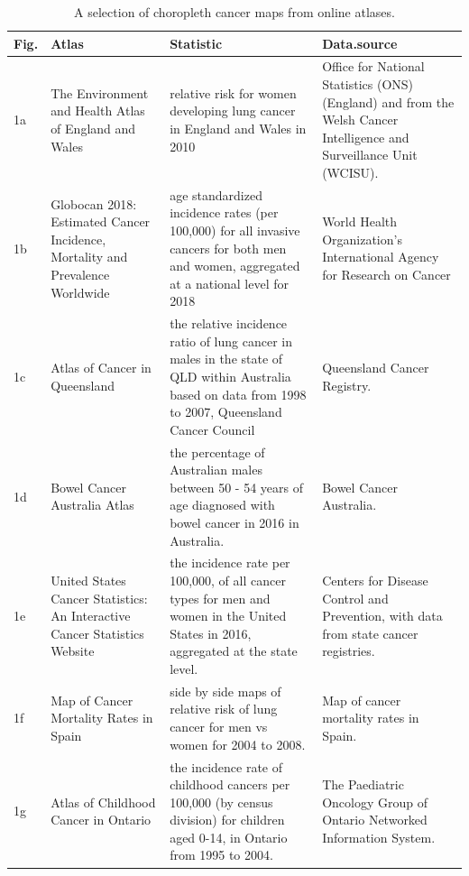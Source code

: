 \documentclass{monashthesis}
\begin{document}
\begin{table}

\caption{\label{tab:choropleths}A selection of choropleth cancer maps from online atlases.}
\centering
\begin{tabular}[t]{l>{\raggedright\arraybackslash}p{7em}>{\raggedright\arraybackslash}p{15em}>{\raggedright\arraybackslash}p{15em}}
\toprule
Fig. & Atlas & Statistic & Data.source\\
\midrule
1a & The Environment and Health Atlas of England and Wales & relative risk for women developing lung cancer in England and Wales in 2010 & Office for National Statistics (ONS) (England) and from the Welsh Cancer Intelligence and Surveillance Unit (WCISU).\\
1b & Globocan 2018: Estimated Cancer Incidence, Mortality and Prevalence Worldwide & age standardized incidence rates (per 100,000) for all invasive cancers for both men and women, aggregated at a national level for 2018 & World Health Organization's International Agency for Research on Cancer\\
\addlinespace
1c & Atlas of Cancer in Queensland & the relative incidence ratio of lung cancer in males in the state of QLD within Australia based on data from 1998 to 2007, Queensland Cancer Council & Queensland Cancer Registry.\\
1d & Bowel Cancer Australia Atlas & the percentage of Australian males between 50 - 54 years of age diagnosed with bowel cancer in 2016 in Australia. & Bowel Cancer Australia.\\
\addlinespace
1e & United States Cancer Statistics: An Interactive Cancer Statistics Website & the incidence rate per 100,000, of all cancer types for men and women in the United States in 2016, aggregated at the state level. & Centers for Disease Control and Prevention, with data from state cancer registries.\\
1f & Map of Cancer Mortality Rates in Spain & side by side maps of relative risk of lung cancer for men vs women for 2004 to 2008. & Map of cancer mortality rates in Spain.\\
\addlinespace
1g & Atlas of Childhood Cancer in Ontario & the incidence rate of childhood cancers per 100,000 (by census division) for children aged 0-14, in Ontario from 1995 to 2004. & The Paediatric Oncology Group of Ontario Networked Information System.\\
\bottomrule
\end{tabular}
\end{table}
\end{document}
